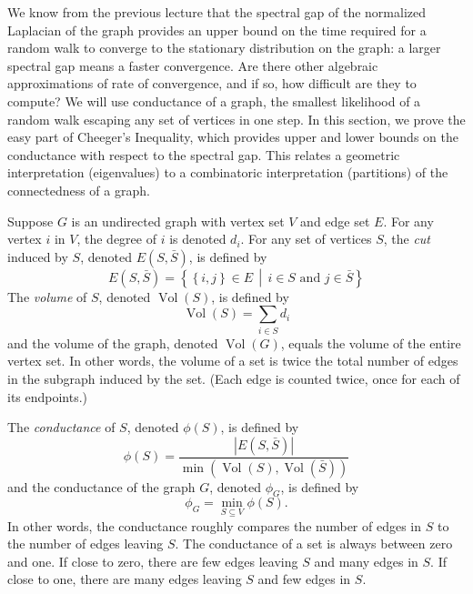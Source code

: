 \documentclass[11pt]{article}
\newcommand{\1}{\mathbf{1}}
\newcommand{\0}{\mathbf{0}}
\DeclareMathOperator*{\Vol}{Vol}
\begin{document}
We know from the previous lecture that the spectral gap of the normalized Laplacian of the graph provides an upper bound on the time required for a random walk to converge to the stationary distribution on the graph: a larger spectral gap means a faster convergence.
Are there other algebraic approximations of rate of convergence, and if so, how difficult are they to compute?
We will use conductance of a graph, the smallest likelihood of a random walk escaping any set of vertices in one step.
In this section, we prove the easy part of Cheeger's Inequality,
which provides upper and lower bounds on the conductance with respect to the spectral gap.
This relates a geometric interpretation (eigenvalues) to a combinatoric interpretation (partitions) of the connectedness of a graph.

Suppose $G$ is an undirected graph with vertex set $V$ and edge set $E$.
For any vertex $i$ in $V$, the degree of $i$ is denoted $d_i$.
For any set of vertices $S$, the \emph{cut} induced by $S$, denoted $E(S, \bar{S})$, is defined by
\begin{equation*}
  E(S, \bar{S}) = \left\{\left\{i, j\right\} \in E \,\middle|\, i \in S \text{ and } j \in \bar{S} \right\}
\end{equation*}
The \emph{volume} of $S$, denoted $\Vol(S)$, is defined by
\begin{equation*}
  \Vol(S) = \sum_{i \in S} d_i
\end{equation*}
and the volume of the graph, denoted $\Vol(G)$, equals the volume of the entire vertex set.
In other words, the volume of a set is twice the total number of edges in the subgraph induced by the set.
(Each edge is counted twice, once for each of its endpoints.)

The \emph{conductance} of $S$, denoted $\phi(S)$, is defined by
\begin{equation*}
  \phi(S) = \frac{|E(S, \bar{S})|}{\min(\Vol(S), \Vol(\bar{S}))}
\end{equation*}
and the conductance of the graph $G$, denoted $\phi_G$, is defined by
\begin{equation*}
  \phi_G = \min_{S \subseteq V} \phi(S).
\end{equation*}
In other words, the conductance roughly compares the number of edges in $S$ to the number of edges leaving $S$.
The conductance of a set is always between zero and one.
If close to zero, there are few edges leaving $S$ and many edges in $S$.
If close to one, there are many edges leaving $S$ and few edges in $S$.
\end{document}
